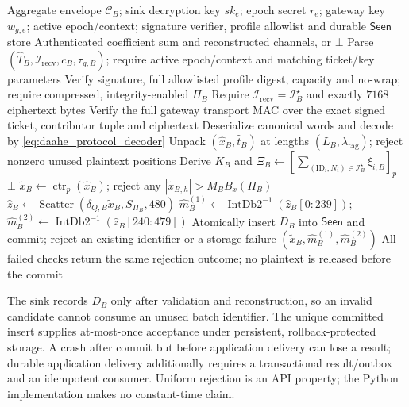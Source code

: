 \begin{algorithm}[t]
\caption{Sink Verification and Single-Polynomial Unpacking}
\label{alg:sink}
\small
\begin{algorithmic}[1]
\Require Aggregate envelope $\mathcal{C}_B$; sink decryption key $sk_e$;
 epoch secret $r_e$; gateway key $w_{g,e}$; active epoch/context;
 signature verifier, profile allowlist and durable $\mathsf{Seen}$ store
\Ensure Authenticated coefficient sum and reconstructed channels, or $\bot$
\State Parse $(\widehat{T}_B,\mathcal{I}_{\mathrm{recv}},c_B,\tau_{g,B})$;
 require active epoch/context and matching ticket/key parameters
\State Verify signature, full allowlisted profile digest, capacity and no-wrap;
 require compressed, integrity-enabled $\Pi_B$
\State Require $\mathcal{I}_{\mathrm{recv}}=\mathcal{I}^{\star}_B$ and exactly $7168$ ciphertext bytes
\State Verify the full gateway transport MAC over the exact signed ticket,
 contributor tuple and ciphertext
\State Deserialize canonical words and decode by \eqref{eq:daahe_protocol_decoder}
\State Unpack $(\widehat{x}_B,\widehat{t}_B)$ at lengths
 $(L_B,\lambda_{\mathrm{tag}})$; reject nonzero unused plaintext positions
\State Derive $K_B$ and
 $\Xi_B\gets[\sum_{(\mathrm{ID}_i,N_i)\in\mathcal{I}^{\star}_B}\xi_{i,B}]_p$
 \State \Return $\bot$
\EndIf
\State $\widetilde{x}_B\gets\operatorname{ctr}_p(\widehat{x}_B)$;
 reject any $|\widetilde{x}_{B,h}|>M_B B_x(\Pi_B)$
\State $\widehat{z}_B\gets\operatorname{Scatter}
       (\delta_{Q,B}\widetilde{x}_B,S_{\Pi_B},480)$
\State $\widehat{m}^{(1)}_B\gets\operatorname{IntDb2}^{-1}(\widehat{z}_B[0{:}239])$;
 $\widehat{m}^{(2)}_B\gets\operatorname{IntDb2}^{-1}(\widehat{z}_B[240{:}479])$
\State Atomically insert $D_B$ into $\mathsf{Seen}$ and commit;
 reject an existing identifier or a storage failure
\State \Return $(\widetilde{x}_B,\widehat{m}^{(1)}_B,\widehat{m}^{(2)}_B)$
\Statex All failed checks return the same rejection outcome; no plaintext is released before the commit
\end{algorithmic}
\end{algorithm}

The sink records $D_B$ only after validation and reconstruction, so an invalid
candidate cannot consume an unused batch identifier. The unique committed
insert supplies at-most-once acceptance under persistent, rollback-protected
storage. A crash after commit but before application delivery can lose a result;
durable application delivery additionally requires a transactional result/outbox
and an idempotent consumer. Uniform rejection is an API property; the Python
implementation makes no constant-time claim.

